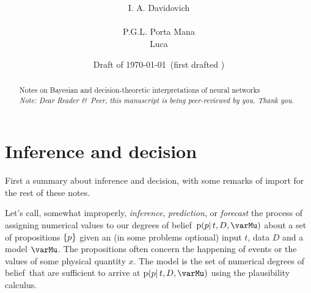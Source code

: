 \documentclass[\ifafour a4paper,12pt,\else a5paper,10pt,\fi%
onecolumn,oneside,article,%
british%
]{memoir}
\title{\propertitle%
}
\author{%
\hspace*{\stretch{1}}%
\parbox{0.5\linewidth}%
{\protect\centering I. A. Davidovich\\%
\footnotesize\epost{\email{ivan.davidovich}{ntnu.no}}}%
\hspace*{\stretch{1}}%
\parbox{0.5\linewidth}%
{\protect\centering\ifpublic P.G.L.  Porta Mana\\\else Luca  \fi%
\footnotesize\epost{\email{piero.mana}{ntnu.no}}}%
\hspace*{\stretch{1}}%
}
\date{Draft of \today\ (first drafted \firstdraft)}
\theoremstyle{remark}
\theoremstyle{innote}
\newcommand*{\amp}{\&}
\newcommand*{\asudedication}[1]{%
{\par\centering\textit{#1}\par}}
\DeclarePairedDelimiter\set{\{}{\}}
\newcommand*{\pf}{\mathrm{p}}%
\renewcommand*{\|}{\mathpunct{|}}
\newcommand*{\dobs}{degrees of belief}
\newcommand*{\yp}{p}
\newcommand*{\yD}{D}
\newcommand*{\yM}{\varMu}
\begin{document}
\captiondelim{\quad}\captionnamefont{\footnotesize}\captiontitlefont{\footnotesize}
\frenchspacing

\maketitle
\abstractrunin
\abslabeldelim{}
\renewcommand*{\abstractname}{}
\setlength{\absleftindent}{0pt}
\setlength{\absrightindent}{0pt}
\setlength{\abstitleskip}{-\absparindent}
\begin{abstract}%
  \noindent Notes on Bayesian and decision-theoretic interpretations of
  neural networks
\ifpublic\\\noindent\emph{\footnotesize Note: Dear Reader \amp\ Peer, this
  manuscript is being peer-reviewed by you. Thank you.}\fi
\end{abstract}

\frenchspacing


\section{Inference and decision}
\label{sec:intro}

First a summary about inference and decision, with some remarks of import
for the rest of these notes.

Let's call, somewhat improperly, \emph{inference}, \emph{prediction}, or
\emph{forecast} the process of assigning numerical values to our \dobs\
$\pf(\yp \|t, \yD, \yM)$ about a set of propositions $\set{\yp}$ given an
(in some problems optional) input $t$, data $\yD$ and a model $\yM$. The
propositions often concern the happening of events or the values of some
physical quantity $x$. The model is the set of numerical \dobs\ that are
sufficient to arrive at $\pf(\yp \|t, \yD, \yM)$ using the plausibility
calculus.
\end{document}
